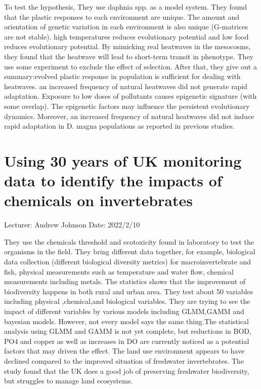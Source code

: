 \documentclass[11pt]{article}
\begin{document}
To test the hypothesis, They use daphnia spp. as a model system. They found that the plastic responses to each environment are unique. The amount and orientation of genetic variation in each environment is also unique (G-matrices are not stable). high temperatures reduces evolutionary potential and low food reduces evolutionary potential. By mimicking real heatwaves in the mesocosms, they found that the heatwave will lead to short-term transit in phenotype. They use some experiment to exclude the effect of selection. After that, they give out a summary:evolved plastic response in population is sufficient for dealing with heatwaves. an increased frequency of natural heatwaves did not generate rapid adaptation. Exposure to low doses of pollutants causes epigenetic signature (with some overlap). The epigenetic factors may influence the persistent evolutionary dynamics. Moreover, an increased frequency of natural heatwaves did not induce rapid adaptation in D. magna populations as reported in previous studies.


\newpage





\section{Using 30 years of UK monitoring data to identify the impacts of chemicals on invertebrates}
Lecturer: Andrew Johnson
\newline
Date: 2022/2/10
\newline

They use the chemicals threshold and ecotoxicity found in laboratory to test the organisms in the field. They bring different data together, for example, biological data collection (different biological diversity metrics) for macroinvertebrate and fish, physical measurements such as temperature and water flow, chemical measurements including metals. The statistics shows that the improvement of biodiversity happens in both rural and urban area. They test about 50 variables including physical ,chemical,and biological variables. They are trying to see the impact of different variables by various models including GLMM,GAMM and bayesian models. However, not every model says the same thing.The statistical analysis using GLMM and GAMM is not yet complete, but reductions in BOD, PO4 and copper as well as increases in DO are currently noticed as a potential factors that may driven the effect. The land use environment appears to have declined compared to the improved situation of freshwater invertebrates. The study found that the UK does a good job of preserving freshwater biodiversity, but struggles to manage land ecosystems.
\end{document}
